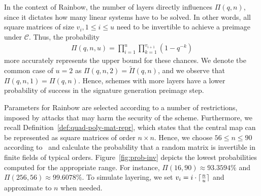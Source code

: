 \documentclass[english]{ufsc-thesis-rn46-2019/ufsc-thesis-rn46-2019}
\DeclarePairedDelimiter{\ceil}{\lceil}{\rceil}
\theoremstyle{definition}
\begin{document}
In the context of Rainbow, the number of layers directly influences
$\Pi(q, n)$, since it dictates how many linear systems have to be solved. In
other words, all square matrices of size $v_{i}, 1 \leq i \leq u$ need to be
invertible to achieve a preimage under $\mathcal{C}$. Thus, the probability
\begin{align}
  \Pi(q, n, u) = \prod_{i = 1}^{u} \prod_{k = 1}^{v_{i + 1}} (1 - q^{-k})
\end{align}
more accurately represents the upper bound for these chances. We denote tbe
common case of $u = 2$ as $\Pi(q, n, 2) = \widetilde{\Pi}(q, n)$, and we
observe that $\Pi(q, n, 1) = \Pi(q, n)$. Hence, schemes with more layers have
a lower probability of success in the signature generation preimage step.

Parameters for Rainbow are selected according to a number of restrictions,
imposed by attacks that may harm the security of the scheme. Furthermore, we
recall Definition~\ref{def:quad-poly-mat-repr}, which states that the central
map can be represented as square matrices of order $n \times n$. Hence, we
choose $56 \leq n \leq 90$ according
to~\cite[Tabs.~6.4,~6.8,~6.13]{Petzoldt:201307} and calculate the probability
that a random matrix is invertible in finite fields of typical
orders. Figure~\ref{fig:prob-inv} depicts the lowest probabilities computed for
the appropriate range. For instance, $\Pi(16, 90) \approx 93.3594\%$ and
$\Pi(256, 56) \approx 99.6078\%$. To simulate layering, we set
$v_{i} = i \cdot \ceil{\frac{n}{u}}$ and approximate to $n$ when needed.
\end{document}
